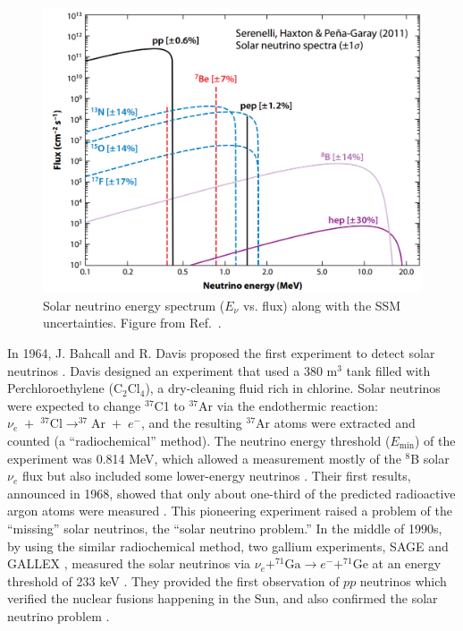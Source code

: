 \begin{figure}[htbp]
	\centering	
	\includegraphics[width=12cm]{haxton09.png}
	\caption[Solar neutrino energy spectrum.]{Solar neutrino energy spectrum ($E_\nu$ vs. flux) along with the SSM uncertainties. Figure from Ref.~\cite{haxton2013solar}.}
	\label{fig:haxton2013plot}
\end{figure}
In 1964, J. Bahcall and R. Davis proposed the first experiment to detect solar neutrinos \cite{bahcall1964solar,davis1964solar}. Davis designed an experiment that used a 380 m$^3$ tank filled with Perchloroethylene (C$_2$Cl$_4$), a dry-cleaning fluid rich in chlorine. Solar neutrinos were expected to change $^{37}$C1 to $^{37}$Ar via the endothermic reaction: $\nu_e\;+\;^{37}\mathrm{Cl}\to ^{37}$Ar$\;+\;e^-$, and the resulting $^{37}$Ar atoms were extracted and counted (a ``radiochemical'' method). The neutrino energy threshold ($E_{\mathrm{min}}$) of the experiment was 0.814 MeV, which allowed a measurement mostly of the $^8$B solar $\nu_e$ flux but also included some lower-energy neutrinos \cite{davis1964solar}. Their first results, announced in 1968, showed that only about one-third of the predicted radioactive argon atoms were measured \cite{davis1968search}. This pioneering experiment raised a problem of the ``missing'' solar neutrinos, the ``solar neutrino problem.'' In the middle of 1990s, by using the similar radiochemical method, two gallium experiments, SAGE \cite{gavrin2011russian} and GALLEX \cite{hampel1999gallex}, measured the solar neutrinos via $\nu_e+^{71}\mathrm{Ga} \to e^- + ^{71}\mathrm{Ge}$ at an energy threshold of 233 keV \cite{suzuki2020sun}. They provided the first observation of $pp$ neutrinos which verified the nuclear fusions happening in the Sun, and also confirmed the solar neutrino problem \cite{suzuki2020sun,zuber2020neutrino}.

